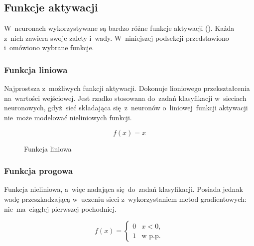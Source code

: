 \subsection{Funkcje aktywacji}
W~neuronach wykorzystywane są bardzo różne funkcje aktywacji (\cite{activation-functions}). Każda z~nich zawiera swoje
zalety i~wady. W~niniejszej podsekcji przedstawiono i~omówiono wybrane funkcje.

\subsubsection{Funkcja liniowa}
Najprostsza z~możliwych funkcji aktywacji. Dokonuje lioniowego przekształcenia na~wartości wejściowej. Jest rzadko
stosowana do~zadań klasyfikacji w~sieciach neuronowych, gdyż~sieć składająca się~z~neuronów o~liniowej~funkcji
aktywacji nie~może modelować nieliniowych funkcji.

\begin{equation}
f(x)=x
\end{equation}
\begin{figure}[H]
    \centering
    \caption{Funkcja liniowa}
\end{figure}

\subsubsection{Funkcja progowa}
Funkcja nieliniowa, a~więc nadająca się~do~zadań klasyfikacji. Posiada jednak wadę przeszkadzającą w~uczeniu sieci
z~wykorzystaniem metod gradientowych: nie~ma~ciągłej pierwszej pochodniej.

\begin{equation}
	f(x) =
	\begin{cases}
	0 & x<0, \\
	1 & \textrm{w p.p.}
	\end{cases}
\end{equation}

